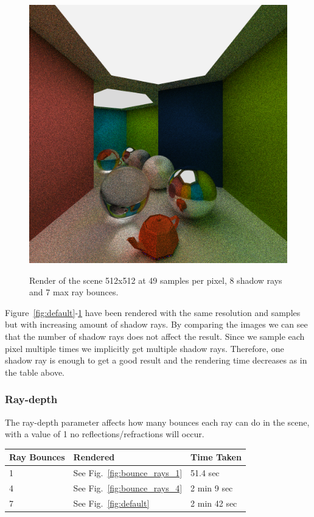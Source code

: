 \documentclass[a4paper, twocolumn]{article}
\begin{document}
            \begin{figure}[H]
                \centering
                \caption{Render of the scene 512x512 at 49 samples per pixel, 8 shadow rays and 7 max ray bounces.}
                \includegraphics[width=0.8\linewidth]{share/results/shadow_rays_8.png}
                \label{fig:shadow_rays_8}
            \end{figure}

            Figure~\ref{fig:default}-\ref{fig:shadow_rays_8} have been rendered with the same resolution and samples but with increasing amount of shadow rays. By comparing the images we can see that the number of shadow rays does not affect the result. Since we sample each pixel multiple times we implicitly get multiple shadow rays. Therefore, one shadow ray is enough to get a good result and the rendering time decreases as in the table above.

            \subsubsection*{Ray-depth}

            The ray-depth parameter affects how many bounces each ray can do in the scene, with a value of 1 no reflections/refractions will occur.

            \begin{table}[H]
            \centering
            \begin{tabular}{lll}
                \toprule
                \textbf{Ray Bounces}&\textbf{Rendered}&\textbf{Time Taken}\\
                \midrule
                1&See Fig.~\ref{fig:bounce_rays_1}&51.4 sec\\
                4&See Fig.~\ref{fig:bounce_rays_4}&2 min 9 sec\\
                7&See Fig.~\ref{fig:default}&2 min 42 sec\\
                \bottomrule
            \end{tabular}
            \label{tab:ray_bounces}
            \end{table}
\end{document}
